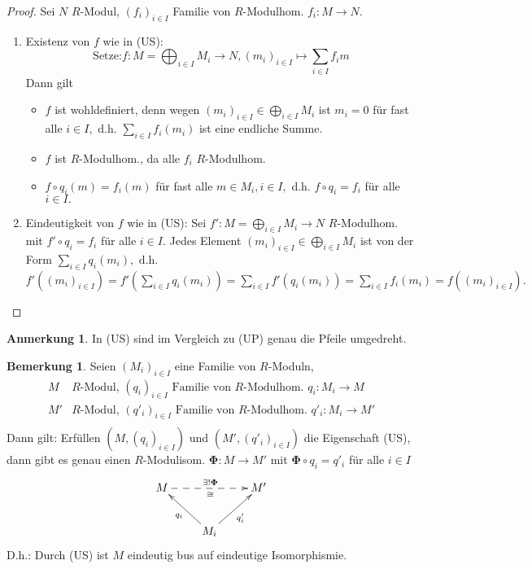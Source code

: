 \documentclass[a4paper, titlepage]{article}
\theoremstyle{definition}
\newtheorem{bem}[satz]{Bemerkung}
\newtheorem*{anm}{Anmerkung}
\begin{document}
        \begin{proof}
            Sei $N$ $R$-Modul, $(f_i)_{i\in I}$ Familie von $R$-Modulhom. $f_i:M\longrightarrow N.$
            \begin{enumerate}[1.]
                \item Existenz von $f$ wie in (US):
                $$\text{Setze:} f:M=\bigoplus_{i\in I}M_i\longrightarrow N, (m_i)_{i\in I}\longmapsto \sum_{i\in I}f_i{m}$$
                Dann gilt 
                \begin{itemize}
                    \item $f$ ist wohldefiniert, denn wegen $(m_i)_{i\in I}\in \bigoplus\limits_{i\in I}M_i$ ist $m_i=0$ für fast alle $i\in I,$ d.h. $\sum\limits_{i\in I}f_i(m_i)$ ist eine endliche Summe.
                    \item $f$ ist $R$-Modulhom., da alle $f_i$ $R$-Modulhom.
                    \item $f\circ q_i(m)=f_i(m)$ für fast alle $m\in M_i,i\in I,$ d.h. $f\circ q_i=f_i$ für alle $i\in I.$
                \end{itemize}
                \item Eindeutigkeit von $f$ wie in (US):\newline
                Sei $f':M=\bigoplus\limits_{i\in I}M_i\longrightarrow N$ $R$-Modulhom. mit $f'\circ q_i=f_i$ für alle $i\in I.$ Jedes Element $(m_i)_{i\in I}\in \bigoplus\limits_{i\in I}M_i$ ist von der Form $\sum\limits_{i\in I}q_i(m_i),$ d.h. $f'((m_i)_{i\in I})=f'(\sum\limits_{i\in I}q_i(m_i))=\sum\limits_{i\in I}f'(q_i(m_i))=\sum\limits_{i\in I}f_i(m_i)=f((m_i)_{i\in I}).$
            \end{enumerate}
        \end{proof}
        \begin{anm}
            In (US) sind im Vergleich zu (UP) genau die Pfeile umgedreht.
        \end{anm}
        \begin{bem}
            Seien $(M_i)_{i\in I}$ eine Familie von $R$-Moduln,
            \begin{align*}
                M& R\text{-Modul, }(q_i)_{i\in I}\text{ Familie von }R\text{-Modulhom. }q_i:M_i\longrightarrow M\\
                M'& R\text{-Modul, }(q'_i)_{i\in I}\text{ Familie von }R\text{-Modulhom. }q'_i:M_i\longrightarrow M'\\
            \end{align*}
            Dann gilt: \newline 
            Erfüllen $(M,(q_i)_{i\in I})$ und $(M',(q'_i)_{i\in I})$ die Eigenschaft (US), dann gibt es genau einen $R$-Modulisom. $\boldsymbol{\Phi}:M\longrightarrow M'$ mit $ \boldsymbol{\Phi}\circ q_i=q'_i$ für alle $i\in I$
            \[ 
                \begin{xy}
                    \xymatrix{
                    M \ar@{-->}[rr]_{\cong}^{\exists!\boldsymbol{\Phi}}  &&M'\\
                    &\ar[ul]^{q_i}M_i\ar[ru]_{q'_i}&
                    }
                \end{xy}
                \]
            D.h.: Durch (US) ist $M$ eindeutig bus auf eindeutige Isomorphismie.
        \end{bem}
\end{document}

